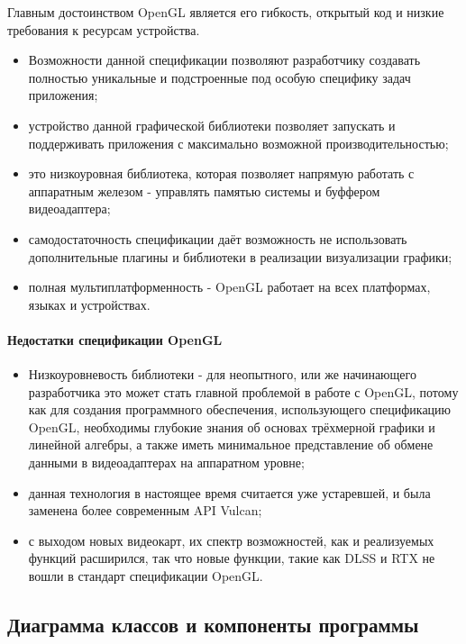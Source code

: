 Главным достоинством OpenGL является его гибкость, открытый код и низкие требования к ресурсам устройства.

\begin{itemize}
	\item Возможности данной спецификации позволяют разработчику создавать полностью уникальные и подстроенные под особую специфику задач приложения;
	\item устройство данной графической библиотеки позволяет запускать и поддерживать приложения с максимально возможной производительностью;
	\item это низкоуровная библиотека, которая позволяет напрямую работать с аппаратным железом - управлять памятью системы и буффером видеоадаптера;
	\item самодостаточность спецификации даёт возможность не использовать дополнительные плагины и библиотеки в реализации визуализации графики;
	\item полная мультиплатформенность - OpenGL работает на всех платформах, языках и устройствах.
\end{itemize}

\paragraph{Недостатки спецификации OpenGL}

\begin{itemize}
	\item Низкоуровневость библиотеки - для неопытного, или же начинающего разработчика это может стать главной проблемой в работе с OpenGL, потому как для создания программного обеспечения, использующего спецификацию OpenGL, необходимы глубокие знания об основах трёхмерной графики и линейной алгебры, а также иметь минимальное представление об обмене данными в видеоадаптерах на аппаратном уровне;
	\item данная технология в настоящее время считается уже устаревшей, и была заменена более современным API Vulcan;
	\item с выходом новых видеокарт, их спектр возможностей, как и реализуемых функций расширился, так что новые функции, такие как DLSS и RTX не вошли в стандарт спецификации OpenGL.
\end{itemize}

\subsection{Диаграмма классов и компоненты программы}

